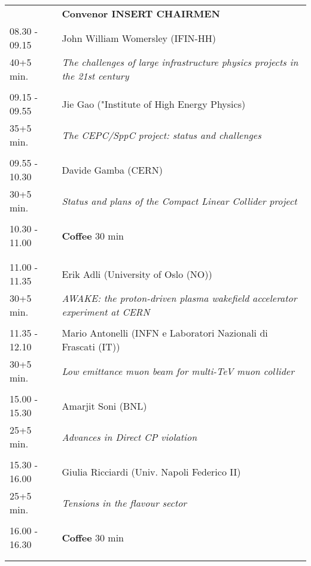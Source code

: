 \begin{longtable}{p{3cm}p{13cm}}
&\hfill {\bf Convenor INSERT CHAIRMEN }\\ 
08.30 - 09.15 & John William Womersley (IFIN-HH)\\ 
40+5 min. & {\it The challenges of large infrastructure physics projects in the 21st century}\\ 
 & \\ 
09.15 - 09.55 & Jie Gao ("Institute of High Energy Physics)\\ 
35+5 min. & {\it The CEPC/SppC project: status and challenges}\\ 
 & \\ 
09.55 - 10.30 & Davide Gamba (CERN)\\ 
30+5 min. & {\it Status and plans of the Compact Linear Collider project}\\ 
 & \\ 
10.30 - 11.00 & {\bf Coffee} \hfill 30 min \\ 
 & \\ 
 & \\ 
11.00 - 11.35 & Erik Adli (University of Oslo (NO))\\ 
30+5 min. & {\it AWAKE: the proton-driven plasma wakefield accelerator experiment at CERN}\\ 
 & \\ 
11.35 - 12.10 & Mario Antonelli (INFN e Laboratori Nazionali di  Frascati (IT))\\ 
30+5 min. & {\it Low emittance muon beam for multi-TeV muon collider}\\ 
 & \\ 
15.00 - 15.30 & Amarjit Soni (BNL)\\ 
25+5 min. & {\it Advances in Direct CP violation}\\ 
 & \\ 
15.30 - 16.00 & Giulia Ricciardi (Univ. Napoli Federico II)\\ 
25+5 min. & {\it Tensions in the flavour sector}\\ 
 & \\ 
16.00 - 16.30 & {\bf Coffee} \hfill 30 min \\ 
 & \\ 
 & \\ 
\end{longtable}

